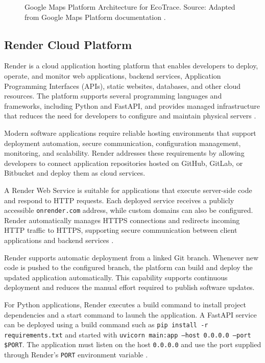 \begin{figure}[H]
  \centering
  \caption{Google Maps Platform Architecture for EcoTrace. Source: Adapted from Google Maps Platform documentation \citep{google2026maps,google2026routes}.}
  \label{fig:maps-arch}
\end{figure}

\subsection{Render Cloud Platform}

Render is a cloud application hosting platform that enables developers to deploy,
operate, and monitor web applications, backend services, Application
Programming Interfaces (APIs), static websites, databases, and other cloud
resources. The platform supports several programming languages and
frameworks, including Python and FastAPI, and provides managed infrastructure
that reduces the need for developers to configure and maintain physical servers
\citep{render2026webservices}.

Modern software applications require reliable hosting environments that
support deployment automation, secure communication, configuration
management, monitoring, and scalability. Render addresses these requirements by
allowing developers to connect application repositories hosted on GitHub, GitLab,
or Bitbucket and deploy them as cloud services.

A Render Web Service is suitable for applications that execute server-side code
and respond to HTTP requests. Each deployed service receives a publicly
accessible \texttt{onrender.com} address, while custom domains can also be
configured. Render automatically manages HTTPS connections and redirects
incoming HTTP traffic to HTTPS, supporting secure communication between client
applications and backend services \citep{render2026webservices}.

Render supports automatic deployment from a linked Git branch. Whenever
new code is pushed to the configured branch, the platform can build and deploy
the updated application automatically. This capability supports continuous
deployment and reduces the manual effort required to publish software updates.

For Python applications, Render executes a build command to install project
dependencies and a start command to launch the application. A FastAPI service
can be deployed using a build command such as \texttt{pip install -r
requirements.txt} and started with \texttt{uvicorn main:app --host 0.0.0.0
--port \$PORT}. The application must listen on the host \texttt{0.0.0.0} and use
the port supplied through Render's \texttt{PORT} environment variable
\citep{render2026fastapi}.

